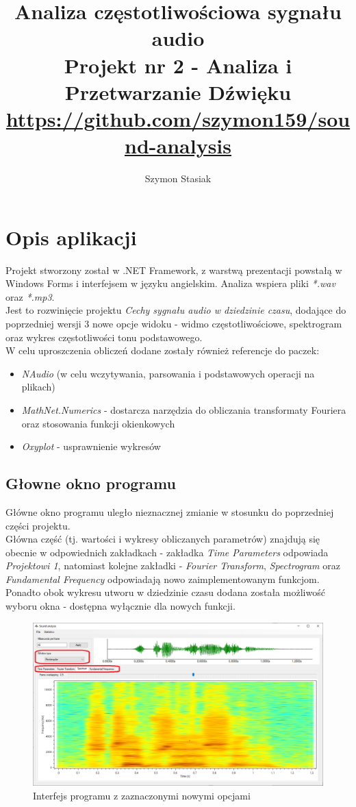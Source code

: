 \documentclass[a4paper]{article}
\title{Analiza częstotliwościowa sygnału audio\\
\large Projekt nr 2 - Analiza i Przetwarzanie Dźwięku\\ 
\small \url{https://github.com/szymon159/sound-analysis}}
\date{}
\author{Szymon Stasiak}
\begin{document}
  \maketitle

\section{Opis aplikacji}
Projekt stworzony został w .NET Framework, z warstwą prezentacji powstałą w Windows Forms i interfejsem w języku angielskim. Analiza wspiera pliki \textit{*.wav} oraz \textit{*.mp3}.\\
Jest to rozwinięcie projektu \textit{Cechy sygnału audio w dziedzinie czasu}, dodające do poprzedniej wersji 3 nowe opcje widoku - widmo częstotliwościowe, spektrogram oraz wykres częstotliwości tonu podstawowego.\\
W celu uproszczenia obliczeń dodane zostały również referencje do paczek:
\begin{itemize}
\item \textit{NAudio} (w celu wczytywania, parsowania i podstawowych operacji na plikach)
\item \textit{MathNet.Numerics} - dostarcza narzędzia do obliczania transformaty Fouriera oraz stosowania funkcji okienkowych
\item \textit{Oxyplot} - usprawnienie wykresów
\end{itemize}

\subsection{Głowne okno programu}
Główne okno programu uległo nieznacznej zmianie w stosunku do poprzedniej części projektu.\\
Główna część (tj. wartości i wykresy obliczanych parametrów) znajdują się obecnie w odpowiednich zakładkach - zakładka \textit{Time Parameters} odpowiada \textit{Projektowi 1}, natomiast kolejne zakładki - \textit{Fourier Transform}, \textit{Spectrogram} oraz \textit{Fundamental Frequency} odpowiadają nowo zaimplementowanym funkcjom.\\
Ponadto obok wykresu utworu w dziedzinie czasu dodana została możliwość wyboru okna - dostępna wyłącznie dla nowych funkcji.
\begin{figure}[H]
  \includegraphics[width=\linewidth]{images/01interface.png}
  \caption{Interfejs programu z zaznaczonymi nowymi opcjami}
\end{figure}
\end{document}
